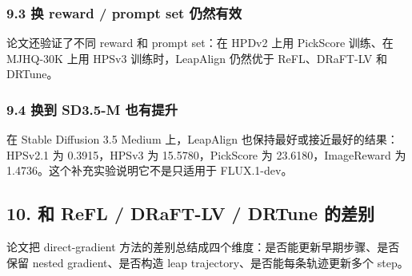 \subsubsection{9.3 换 reward / prompt set 仍然有效}

论文还验证了不同 reward 和 prompt set：在 HPDv2 上用 PickScore 训练、在 MJHQ-30K 上用 HPSv3 训练时，LeapAlign 仍然优于 ReFL、DRaFT-LV 和 DRTune。

\begin{center}
\end{center}

\subsubsection{9.4 换到 SD3.5-M 也有提升}

在 Stable Diffusion 3.5 Medium 上，LeapAlign 也保持最好或接近最好的结果：HPSv2.1 为 0.3915，HPSv3 为 15.5780，PickScore 为 23.6180，ImageReward 为 1.4736。这个补充实验说明它不是只适用于 FLUX.1-dev。

\subsection{10. 和 ReFL / DRaFT-LV / DRTune 的差别}

论文把 direct-gradient 方法的差别总结成四个维度：是否能更新早期步骤、是否保留 nested gradient、是否构造 leap trajectory、是否能每条轨迹更新多个 step。

\begin{center}
\end{center}

